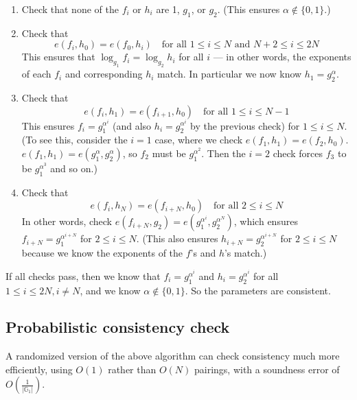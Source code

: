\documentclass{article}
\newcommand{\G}{\mathbb{G}}
\begin{document}
\begin{enumerate}
\item Check that none of the $f_i$ or $h_i$ are 1, $g_1$, or $g_2$. (This ensures $\alpha \notin \{0,1\}$.)

\item Check that \[ e(f_i, h_0) = e(f_0, h_i) \quad\text{for all $1\le i \le N$ and $N+2 \le i \le 2N$}\]
This ensures that $\log_{g_1} f_i = \log_{g_2} h_i$ for all $i$ --- in other words, the exponents of each $f_i$ and corresponding $h_i$ match. In particular we now know $h_1 = g_2^\alpha$.

\item Check that \[e(f_i, h_1) = e(f_{i+1}, h_0) \quad \text{for all $1 \le i \le N-1$}\]
This ensures $f_i = g_1^{\alpha^i}$ (and also $h_i = g_2^{\alpha^i}$ by the previous check) for $1 \le i \le N$. (To see this, consider the $i = 1$ case, where we check $e(f_1, h_1) = e(f_2, h_0)$. $e(f_1, h_1) = e(g_1^\alpha, g_2^\alpha)$, so $f_2$ must be $g_1^{\alpha^2}$. Then the $i=2$ check forces $f_3$ to be $g_1^{\alpha^3}$ and so on.)

\item Check that \[e(f_i, h_N) = e(f_{i+N}, h_0) \quad \text{for all $2 \le i \le N$}\]
In other words, check $e(f_{i+N}, g_2) = e(g_1^{\alpha^{i}}, g_2^{\alpha^{N}})$, which ensures $f_{i+N} = g_1^{\alpha^{i+N}}$ for $2\le i \le N$. (This also ensures $h_{i+N} = g_2^{\alpha^{i+N}}$ for $2 \le i \le N$ because we know the exponents of the $f$'s and $h$'s match.)

\end{enumerate}
If all checks pass, then we know that $f_i = g_1^{\alpha^i}$ and $h_i = g_2^{\alpha^i}$ for all $1 \le i \le 2N, i\ne N$, and we know $\alpha \notin \{0,1\}$. So the parameters are consistent.



\subsection*{Probabilistic consistency check}
A randomized version of the above algorithm can check consistency much more efficiently, using $O(1)$ rather than $O(N)$ pairings, with a soundness error of $O(\frac1{|\G_1|})$.
\end{document}

